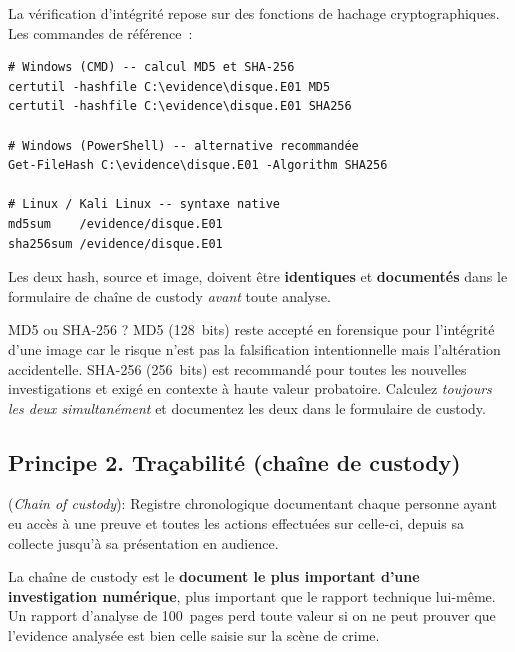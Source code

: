 La vérification d'intégrité repose sur des fonctions de hachage
cryptographiques. Les commandes de référence~:

\begin{lstlisting}[language=bash_forensique,
    caption={Calcul et vérification d'empreintes cryptographiques}]
# Windows (CMD) -- calcul MD5 et SHA-256
certutil -hashfile C:\evidence\disque.E01 MD5
certutil -hashfile C:\evidence\disque.E01 SHA256

# Windows (PowerShell) -- alternative recommandée
Get-FileHash C:\evidence\disque.E01 -Algorithm SHA256

# Linux / Kali Linux -- syntaxe native
md5sum    /evidence/disque.E01
sha256sum /evidence/disque.E01
\end{lstlisting}

Les deux hash, source et image, doivent être \textbf{identiques} et
\textbf{documentés} dans le formulaire de chaîne de custody \emph{avant}
toute analyse.

\begin{boiteRemarque}{MD5 ou SHA-256 ?}
MD5 (128~bits) reste accepté en forensique pour l'intégrité d'une image
car le risque n'est pas la falsification intentionnelle mais l'altération
accidentelle. SHA-256 (256~bits) est recommandé pour toutes les nouvelles
investigations et exigé en contexte à haute valeur probatoire. Calculez
\emph{toujours les deux simultanément} et documentez les deux dans le
formulaire de custody.
\end{boiteRemarque}

\subsection{Principe 2. Traçabilité (chaîne de custody)}
\label{subsec:principe-tracabilite}

\begin{boxdef}
 (\textit{Chain of
custody}): Registre chronologique documentant chaque personne ayant eu
accès à une preuve et toutes les actions effectuées sur celle-ci, depuis
sa collecte jusqu'à sa présentation en audience.
\end{boxdef}

La chaîne de custody est le \textbf{document le plus important d'une
investigation numérique}, plus important que le rapport technique
lui-même. Un rapport d'analyse de 100~pages perd toute valeur si on ne peut
prouver que l'evidence analysée est bien celle saisie sur la scène de crime.

